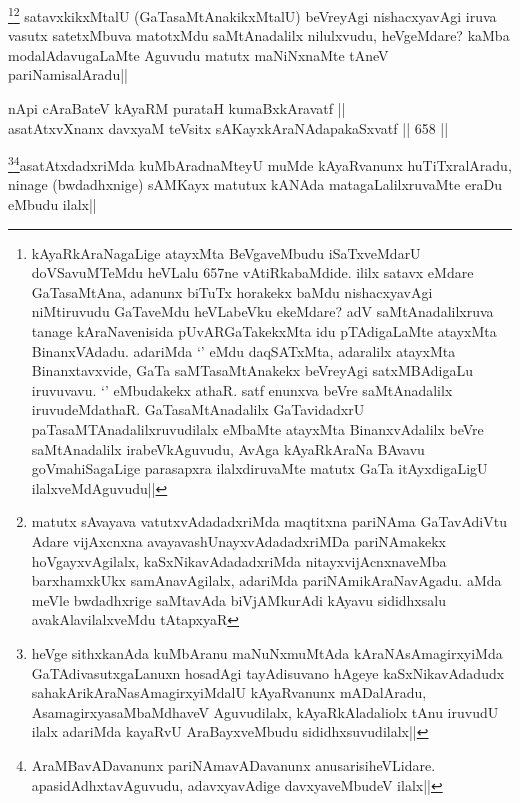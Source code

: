 \begin{artha}
\footnote{kAyaRkAraNagaLige atayxMta BeVgaveMbudu iSaTxveMdarU doVSavuMTeMdu heVLalu 657ne vAtiRkabaMdide. ililx satavx eMdare GaTasaMtAna, adanunx biTuTx horakekx baMdu nishacxyavAgi niMtiruvudu GaTaveMdu heVLabeVku ekeMdare? adV saMtAnadalilxruva tanage kAraNavenisida pUvARGaTakekxMta idu pTAdigaLaMte atayxMta BinanxVAdadu. adariMda `\stext' eMdu daqSATxMta, adaralilx atayxMta Binanxtavxvide, GaTa saMTasaMtAnakekx beVreyAgi satxMBAdigaLu iruvuvavu. `\stext' eMbudakekx athaR. satf enunxva beVre saMtAnadalilx iruvudeMdathaR. GaTasaMtAnadalilx GaTavidadxrU paTasaMTAnadalilxruvudilalx eMbaMte atayxMta BinanxvAdalilx beVre saMtAnadalilx irabeVkAguvudu, AvAga kAyaRkAraNa BAvavu goVmahiSagaLige parasapxra ilalxdiruvaMte matutx GaTa itAyxdigaLigU ilalxveMdAguvudu||}\footnote{matutx sAvayava vatutxvAdadadxriMda maqtitxna pariNAma GaTavAdiVtu Adare vijAxcnxna avayavashUnayxvAdadadxriMDa pariNAmakekx hoVgayxvAgilalx, kaSxNikavAdadadxriMda nitayxvijAcnxnaveMba barxhamxkUkx samAnavAgilalx, adariMda pariNAmikAraNavAgadu. aMda meVle bwdadhxrige saMtavAda biVjAMkurAdi kAyavu sididhxsalu avakAlavilalxveMdu tAtapxyaR} satavxkikxMtalU (GaTasaMtAnakikxMtalU) beVreyAgi nishacxyavAgi iruva vasutx satetxMbuva matotxMdu saMtAnadalilx nilulxvudu, heVgeMdare? kaMba modalAdavugaLaMte Aguvudu matutx maNiNxnaMte tAneV pariNamisalAradu||
\end{artha}


\begin{shl}
nApi cA\s \s raBateV kAyaRM purataH kumaBxkAravatf || \\
asatAtxvXnanx davxyaM teV\s sitx sAKayxkAraNAdapakaSxvatf ||  658 ||  
\end{shl}

\begin{artha}
\footnote{heVge sithxkanAda kuMbAranu maNuNxmuMtAda kAraNAsAmagirxyiMda GaTAdivasutxgaLanuxn hosadAgi tayAdisuvano hAgeye kaSxNikavAdadudx sahakArikAraNasAmagirxyiMdalU kAyaRvanunx mADalAradu, AsamagirxyasaMbaMdhaveV Aguvudilalx, kAyaRkAladaliolx tAnu iruvudU ilalx adariMda kayaRvU AraBayxveMbudu sididhxsuvudilalx||}\footnote{AraMBavADavanunx pariNAmavADavanunx anusarisiheVLidare. apasidAdhxtavAguvudu, adavxyavAdige davxyaveMbudeV ilalx||}asatAtxdadxriMda kuMbAradnaMteyU muMde kAyaRvanunx huTiTxralAradu, ninage (bwdadhxnige) sAMKayx matutux kANAda matagaLalilxruvaMte eraDu eMbudu ilalx||
\end{artha}


